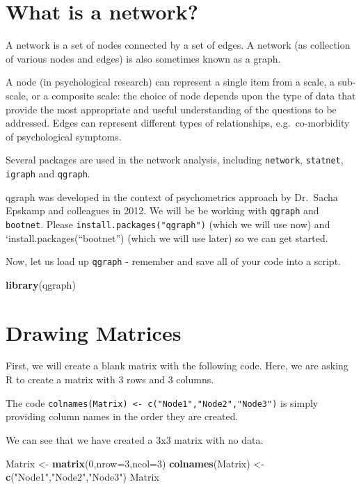 \documentclass[]{book}
\newenvironment{Shaded}{\begin{snugshade}}{\end{snugshade}}
\newcommand{\DataTypeTok}[1]{\textcolor[rgb]{0.13,0.29,0.53}{#1}}
\newcommand{\DecValTok}[1]{\textcolor[rgb]{0.00,0.00,0.81}{#1}}
\newcommand{\KeywordTok}[1]{\textcolor[rgb]{0.13,0.29,0.53}{\textbf{#1}}}
\newcommand{\NormalTok}[1]{#1}
\newcommand{\StringTok}[1]{\textcolor[rgb]{0.31,0.60,0.02}{#1}}
\begin{document}
\hypertarget{what-is-a-network}{%
\section{What is a network?}\label{what-is-a-network}}

A network is a set of nodes connected by a set of edges. A network (as collection of various nodes and edges) is also sometimes known as a graph.

A node (in psychological research) can represent a single item from a scale, a sub-scale, or a composite scale: the choice of node depends upon the type of data that provide the most appropriate and useful understanding of the questions to be addressed. Edges can represent different types of relationships, e.g.~co-morbidity of psychological symptoms.

Several packages are used in the network analysis, including \texttt{network}, \texttt{statnet}, \texttt{igraph} and \texttt{qgraph}.

qgraph was developed in the context of psychometrics approach by Dr.~Sacha Epskamp and colleagues in 2012. We will be be working with \texttt{qgraph} and \texttt{bootnet}. Please \texttt{install.packages("qgraph")} (which we will use now) and `install.packages(``bootnet'') (which we will use later) so we can get started.

Now, let us load up \texttt{qgraph} - remember and save all of your code into a script.

\begin{Shaded}
\begin{Highlighting}[]
\KeywordTok{library}\NormalTok{(qgraph)}
\end{Highlighting}
\end{Shaded}

\hypertarget{drawing-matrices}{%
\section{Drawing Matrices}\label{drawing-matrices}}

First, we will create a blank matrix with the following code. Here, we are asking R to create a matrix with 3 rows and 3 columns.

The code \texttt{colnames(Matrix)\ \textless{}-\ c("Node1","Node2","Node3")} is simply providing column names in the order they are created.

We can see that we have created a 3x3 matrix with no data.

\begin{Shaded}
\begin{Highlighting}[]
\NormalTok{Matrix <-}\StringTok{ }\KeywordTok{matrix}\NormalTok{(}\DecValTok{0}\NormalTok{,}\DataTypeTok{nrow=}\DecValTok{3}\NormalTok{,}\DataTypeTok{ncol=}\DecValTok{3}\NormalTok{)}
\KeywordTok{colnames}\NormalTok{(Matrix) <-}\StringTok{ }\KeywordTok{c}\NormalTok{(}\StringTok{"Node1"}\NormalTok{,}\StringTok{"Node2"}\NormalTok{,}\StringTok{"Node3"}\NormalTok{)}
\NormalTok{Matrix}
\end{Highlighting}
\end{Shaded}
\end{document}
